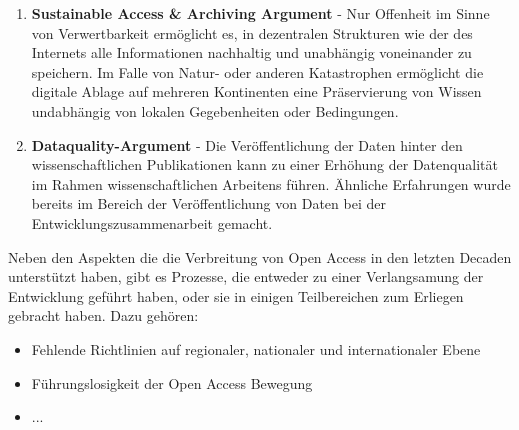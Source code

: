 \begin{enumerate}
\item \textbf{Sustainable Access & Archiving Argument} - Nur Offenheit im Sinne von Verwertbarkeit ermöglicht es, in dezentralen Strukturen wie der des Internets alle Informationen nachhaltig und unabhängig voneinander zu speichern. Im Falle von Natur- oder anderen Katastrophen ermöglicht die digitale Ablage auf mehreren Kontinenten eine Präservierung von Wissen undabhängig von lokalen Gegebenheiten oder Bedingungen.
\item \textbf{Dataquality-Argument} - Die Veröffentlichung der Daten hinter den wissenschaftlichen Publikationen kann zu einer Erhöhung der Datenqualität im Rahmen wissenschaftlichen Arbeitens führen. Ähnliche Erfahrungen wurde bereits im Bereich der Veröffentlichung von Daten bei der Entwicklungszusammenarbeit gemacht\cite{heise_2014_bundestag}.
\end{enumerate}

Neben den Aspekten die die Verbreitung von Open Access in den letzten Decaden unterstützt haben, gibt es Prozesse, die entweder zu einer Verlangsamung der Entwicklung geführt haben, oder sie in einigen Teilbereichen zum Erliegen gebracht haben. Dazu gehören:

\begin{itemize}
\item Fehlende Richtlinien auf regionaler, nationaler und internationaler Ebene
\item Führungslosigkeit der Open Access Bewegung
\item ...
\end{itemize}


